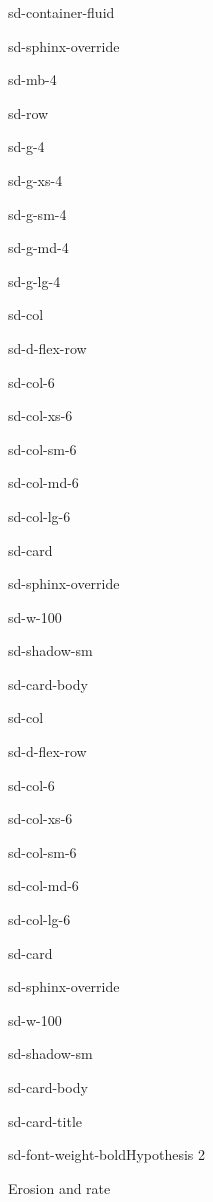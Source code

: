 \documentclass[letterpaper,10pt,english]{jupyterBook}
\begin{document}
\begin{sphinxuseclass}{sd-container-fluid}
\begin{sphinxuseclass}{sd-sphinx-override}
\begin{sphinxuseclass}{sd-mb-4}
\begin{sphinxuseclass}{sd-row}
\begin{sphinxuseclass}{sd-g-4}
\begin{sphinxuseclass}{sd-g-xs-4}
\begin{sphinxuseclass}{sd-g-sm-4}
\begin{sphinxuseclass}{sd-g-md-4}
\begin{sphinxuseclass}{sd-g-lg-4}
\begin{sphinxuseclass}{sd-col}
\begin{sphinxuseclass}{sd-d-flex-row}
\begin{sphinxuseclass}{sd-col-6}
\begin{sphinxuseclass}{sd-col-xs-6}
\begin{sphinxuseclass}{sd-col-sm-6}
\begin{sphinxuseclass}{sd-col-md-6}
\begin{sphinxuseclass}{sd-col-lg-6}
\begin{sphinxuseclass}{sd-card}
\begin{sphinxuseclass}{sd-sphinx-override}
\begin{sphinxuseclass}{sd-w-100}
\begin{sphinxuseclass}{sd-shadow-sm}
\begin{sphinxuseclass}{sd-card-body}
\end{sphinxuseclass}
\end{sphinxuseclass}
\end{sphinxuseclass}
\end{sphinxuseclass}
\end{sphinxuseclass}
\end{sphinxuseclass}
\end{sphinxuseclass}
\end{sphinxuseclass}
\end{sphinxuseclass}
\end{sphinxuseclass}
\end{sphinxuseclass}
\end{sphinxuseclass}
\begin{sphinxuseclass}{sd-col}
\begin{sphinxuseclass}{sd-d-flex-row}
\begin{sphinxuseclass}{sd-col-6}
\begin{sphinxuseclass}{sd-col-xs-6}
\begin{sphinxuseclass}{sd-col-sm-6}
\begin{sphinxuseclass}{sd-col-md-6}
\begin{sphinxuseclass}{sd-col-lg-6}
\begin{sphinxuseclass}{sd-card}
\begin{sphinxuseclass}{sd-sphinx-override}
\begin{sphinxuseclass}{sd-w-100}
\begin{sphinxuseclass}{sd-shadow-sm}
\begin{sphinxuseclass}{sd-card-body}
\begin{sphinxuseclass}{sd-card-title}
\begin{sphinxuseclass}{sd-font-weight-bold}Hypothesis 2
\end{sphinxuseclass}
\end{sphinxuseclass}
\sphinxAtStartPar
Erosion and rate


\end{sphinxuseclass}
\end{sphinxuseclass}
\end{sphinxuseclass}
\end{sphinxuseclass}
\end{sphinxuseclass}
\end{sphinxuseclass}
\end{sphinxuseclass}
\end{sphinxuseclass}
\end{sphinxuseclass}
\end{sphinxuseclass}
\end{sphinxuseclass}
\end{sphinxuseclass}
\end{sphinxuseclass}
\end{sphinxuseclass}
\end{sphinxuseclass}
\end{sphinxuseclass}
\end{sphinxuseclass}
\end{sphinxuseclass}
\end{sphinxuseclass}
\end{sphinxuseclass}
\end{sphinxuseclass}
\end{document}
